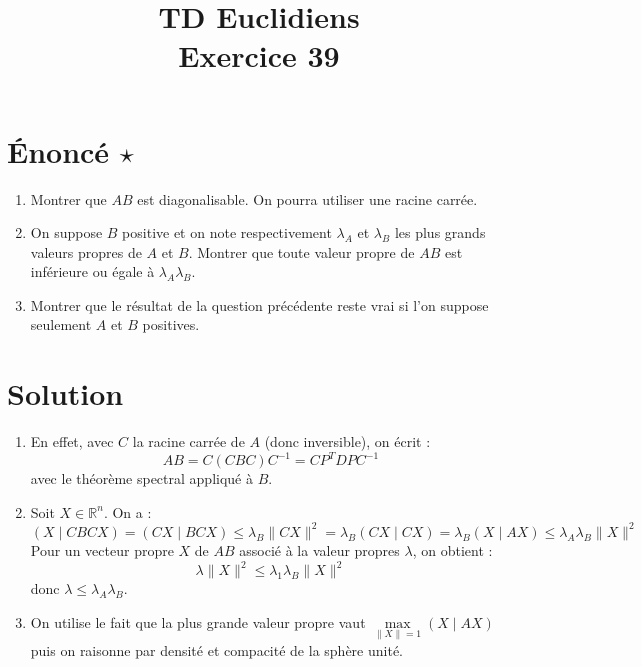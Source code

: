 \documentclass[french]{article}
\title{TD Euclidiens\\ Exercice 39}
\date{}
\newcommand{\R}{\mathbb{R}}
\newcommand{\inv}{^{-1}}
\begin{document}
\maketitle

\section{Énoncé $\star$}
\begin{enumerate}
\item Montrer que $AB$ est diagonalisable. On pourra utiliser une racine carrée.
\item On suppose $B$ positive et on note respectivement $\lambda_A$ et $\lambda_B$ les plus grands valeurs propres de $A$ et $B$. Montrer que toute valeur propre de $AB$ est inférieure ou égale à $\lambda_A\lambda_B$.
\item Montrer que le résultat de la question précédente reste vrai si l'on suppose seulement $A$ et $B$ positives. 
\end{enumerate}
\section{Solution}
\begin{enumerate}
	\item En effet, avec $C$ la racine carrée de $A$ (donc inversible), on écrit : $$AB=C(CBC)C\inv=CP^T DPC\inv$$ avec le théorème spectral appliqué à $B$.
	\item Soit $X\in\R^n$. On a : $$(X\mid CBCX)=(CX\mid BCX)\leqslant\lambda_B\lVert CX\rVert^2=\lambda_B(CX\mid CX)=\lambda_B(X\mid AX)\leqslant \lambda_A\lambda_B\lVert X\rVert^2$$ Pour un vecteur propre $X$ de $AB$ associé à la valeur propres $\lambda$, on obtient : $$\lambda\lVert X\rVert^2\leqslant\lambda_1\lambda_B\lVert X\rVert^2$$ donc $\lambda\leqslant\lambda_A\lambda_B$.
	\item On utilise le fait que la plus grande valeur propre vaut $\displaystyle\underset{\lVert X\rVert=1}{\max}(X\mid AX)$ puis on raisonne par densité et compacité de la sphère unité.
\end{enumerate}
\end{document}

